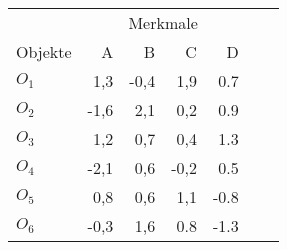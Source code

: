 \begin{tabular}{lrrrrrr}
    \toprule
    & \multicolumn{4}{c}{Merkmale} \\
    \cmidrule(lr){2-5}
    Objekte & A & B & C & D \\ 
    \midrule
    \(O_1\)  & 1,3 & -0,4 & 1,9 & 0.7 \\
    \(O_2\) & -1,6 & 2,1 & 0,2 & 0.9 \\
    \(O_3\) & 1,2 & 0,7 & 0,4 & 1.3 \\
    \(O_4\) & -2,1 & 0,6 & -0,2 & 0.5 \\
    \(O_5\) & 0,8 & 0,6 & 1,1 & -0.8 \\
    \(O_6\) & -0,3 & 1,6 & 0.8 & -1.3 \\
    \bottomrule
\end{tabular}